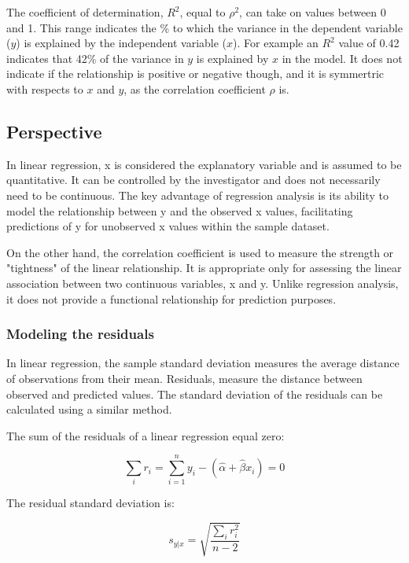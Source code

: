 \documentclass{article}
\begin{document}
The coefficient of determination, $R^2$, equal to $\rho ^2$, can take on values between 0 and 1. This range indicates the \% to which the variance in the dependent variable ($y$) is explained by the independent variable ($x$). For example an $R^2$ value of 0.42 indicates that 42\% of the variance in $y$ is explained by $x$ in the model. It does not indicate if the relationship is positive or negative though, and it is symmertric with respects to $x$ and $y$, as the correlation coefficient $\rho$ is.

\subsection{Perspective}

In linear regression, x is considered the explanatory variable and is assumed to be quantitative. It can be controlled by the investigator and does not necessarily need to be continuous. The key advantage of regression analysis is its ability to model the relationship between y and the observed x values, facilitating predictions of y for unobserved x values within the sample dataset.

On the other hand, the correlation coefficient is used to measure the strength or "tightness" of the linear relationship. It is appropriate only for assessing the linear association between two continuous variables, x and y. Unlike regression analysis, it does not provide a functional relationship for prediction purposes.

\subsubsection{Modeling the residuals}

In linear regression, the sample standard deviation measures the average distance of observations from their mean. 
Residuals, measure the distance between observed and predicted values. The standard deviation of the residuals can be calculated using a similar method. 

The sum of the residuals of a linear regression equal zero:

\begin{equation*}
\sum\limits_{i} {r_i} = \sum_{i=1}^n {y_i-(\hat \alpha + \hat \beta x_i)}=0\end{equation*}

The residual standard deviation is:

\begin{equation*}
s_{y|x}=\sqrt{\frac {\sum\limits_{i} {r_i^2}} {n-2}}
\end{equation*}
\end{document}
